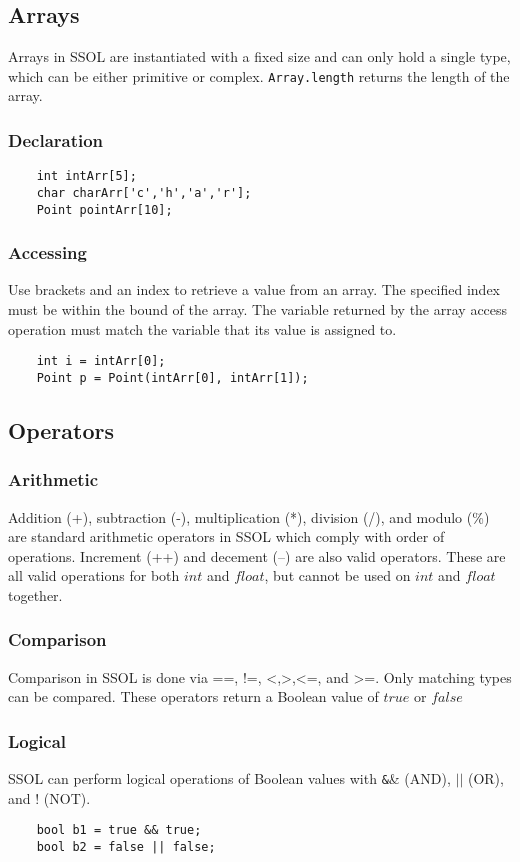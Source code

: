 \documentclass{article}
\begin{document}
\subsection{Arrays}
Arrays in SSOL are instantiated with a fixed size and can only hold a single type, which can be either primitive or complex. \texttt{Array.length} returns the length of the array.
\subsubsection{Declaration}
\begin{verbatim}
    int intArr[5];
    char charArr['c','h','a','r'];
    Point pointArr[10];
\end{verbatim}
\subsubsection{Accessing}
Use brackets and an index to retrieve a value from an array. The specified index must be within the bound of the array. The variable returned by the array access operation must match the variable that its value is assigned to.
\begin{verbatim}
    int i = intArr[0];
    Point p = Point(intArr[0], intArr[1]);
\end{verbatim}
\subsection{Operators}
\subsubsection{Arithmetic}
Addition (+), subtraction (-), multiplication (*), division (/), and modulo (\%) are standard arithmetic operators in SSOL which comply with order of operations. Increment (++) and decement (--) are also valid operators. These are all valid operations for both $int$ and $float$, but cannot be used on $int$ and $float$ together.
\subsubsection{Comparison}
Comparison in SSOL is done via ==, !=, \textless ,\textgreater,\textless=, and \textgreater=. Only matching types can be compared. These operators return a Boolean value of $true$ or $false$

\subsubsection{Logical}
SSOL can perform logical operations of Boolean values with \texttt\&\& (AND),  $||$ (OR), and $!$ (NOT).
\begin{verbatim}
    bool b1 = true && true;
    bool b2 = false || false;
\end{verbatim}
\end{document}
